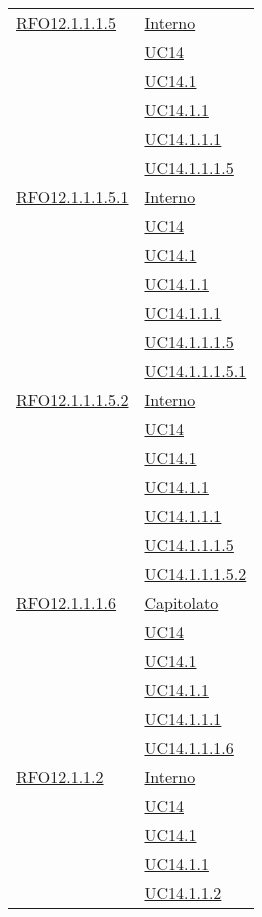 \begin{longtable}{|>{\centering}m{5cm}|m{5cm}<{\centering}|}
 \hyperlink{RFO12.1.1.1.5}{RFO12.1.1.1.5} 
 & \hyperlink{Interno}{Interno}\\
& \hyperref[UC14]{UC14}\\
& \hyperref[UC14.1]{UC14.1}\\
& \hyperref[UC14.1.1]{UC14.1.1}\\
& \hyperref[UC14.1.1.1]{UC14.1.1.1}\\
& \hyperref[UC14.1.1.1.5]{UC14.1.1.1.5}\\\hline

 \hyperlink{RFO12.1.1.1.5.1}{RFO12.1.1.1.5.1} 
 & \hyperlink{Interno}{Interno}\\
& \hyperref[UC14]{UC14}\\
& \hyperref[UC14.1]{UC14.1}\\
& \hyperref[UC14.1.1]{UC14.1.1}\\
& \hyperref[UC14.1.1.1]{UC14.1.1.1}\\
& \hyperref[UC14.1.1.1.5]{UC14.1.1.1.5}\\
& \hyperref[UC14.1.1.1.5.1]{UC14.1.1.1.5.1}\\\hline

 \hyperlink{RFO12.1.1.1.5.2}{RFO12.1.1.1.5.2} 
 & \hyperlink{Interno}{Interno}\\
& \hyperref[UC14]{UC14}\\
& \hyperref[UC14.1]{UC14.1}\\
& \hyperref[UC14.1.1]{UC14.1.1}\\
& \hyperref[UC14.1.1.1]{UC14.1.1.1}\\
& \hyperref[UC14.1.1.1.5]{UC14.1.1.1.5}\\
& \hyperref[UC14.1.1.1.5.2]{UC14.1.1.1.5.2}\\\hline

 \hyperlink{RFO12.1.1.1.6}{RFO12.1.1.1.6} 
  & \hyperlink{Capitolato}{Capitolato}\\
& \hyperref[UC14]{UC14}\\
& \hyperref[UC14.1]{UC14.1}\\
& \hyperref[UC14.1.1]{UC14.1.1}\\
& \hyperref[UC14.1.1.1]{UC14.1.1.1}\\
& \hyperref[UC14.1.1.1.6]{UC14.1.1.1.6}\\\hline

 \hyperlink{RFO12.1.1.2}{RFO12.1.1.2} 
 & \hyperlink{Interno}{Interno}\\
& \hyperref[UC14]{UC14}\\
& \hyperref[UC14.1]{UC14.1}\\
& \hyperref[UC14.1.1]{UC14.1.1}\\
& \hyperref[UC14.1.1.2]{UC14.1.1.2}\\\hline


\end{longtable}
